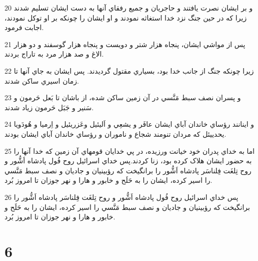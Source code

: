 \par 20 و بر ايشان نصرت يافتند و حاجريان و جميع رفقاي آنها به دست ايشان تسليم شدند زيرا که در حين جنگ نزد خدا استغاثه نمودند و او ايشان را چونکه بر او توکل نمودند، اجابت فرمود.
\par 21 پس از مواشي ايشان، پنجاه هزار شتر و دويست و پنجاه هزار گوسفند و دو هزار الاغ و صد هزار مرد به تاراج بردند.
\par 22 زيرا چونکه جنگ از جانب خدا بود، بسياري مقتول گرديدند. پس ايشان به جاي آنها تا زمان اسيري ساکن شدند.
\par 23 و پسران نصف سبط مَنَّسي در آن زمين ساکن شده، از باشان تا بَعل حَرمون و سَنير و جَبَل حَرمون زياد شدند.
\par 24 و اينانند رؤساي خاندان آباي ايشان عافَر و يشعِي و اَليئيل وعَزريئيل و اِرميا و هُودَويا يحدييئل که مردان تنومند شجاع و ناموران و رؤساي خاندان آباي ايشان بودند.
\par 25 اما به خداي پدران خود خيانت ورزيده، در پي خدايان قومهاي آن زمين که خدا آنها را به حضور ايشان هلاک کرده بود، زنا کردند.پس خداي اسرائيل روح فُول پادشاه اَشُّور و روح تِلغَت فِلناسَر پادشاه اَشُّور را برانگيخت که رؤبينيان و جاديان و نصف سبط مَنَّسي را اسير کرده، ايشان را به حَلَح و خابور و هارا و نهر جوزان تا امروز بُرد.
\par 26 پس خداي اسرائيل روح فُول پادشاه اَشُّور و روح تِلغَت فِلناسَر پادشاه اَشُّور را برانگيخت که رؤبينيان و جاديان و نصف سبط مَنَّسي را اسير کرده، ايشان را به حَلَح و خابور و هارا و نهر جوزان تا امروز بُرد.
 
\chapter{6}

